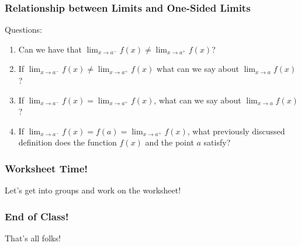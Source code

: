 \documentclass{ltx-talk}
\begin{document}
\begin{frame}
  \frametitle{Relationship between Limits and One-Sided Limits}
  
  Questions: \pause
  \begin{enumerate}
    \item Can we have that $\lim_{x \rightarrow a^{-}} f(x) \neq \lim_{x \rightarrow a^{+}} f(x)$? \pause
    \item If $\lim_{x \rightarrow a^{-}} f(x) \neq \lim_{x \rightarrow a^{+}} f(x)$ what can we say about $\lim_{x \rightarrow a} f(x)$? \pause
    \item If $\lim_{x \rightarrow a^{-}} f(x) = \lim_{x \rightarrow a^{+}} f(x)$, what can we say about $\lim_{x \rightarrow a} f(x)$? \pause
    \item If $\lim_{x \rightarrow a^{-}} f(x) = f(a) = \lim_{x \rightarrow a^{+}} f(x)$, what previously discussed definition does the function $f(x)$ and the point $a$ satisfy? \pause
  \end{enumerate}

\end{frame}

\begin{frame}
  \frametitle{Worksheet Time!}

  Let's get into groups and work on the worksheet!
\end{frame}

\begin{frame}
  \frametitle{End of Class!}

  That's all folks!
\end{frame}
\end{document}
